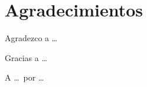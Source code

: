 \newpage
\thispagestyle{plain}

\section*{Agradecimientos} %

Agradezco a \dots

Gracias a \dots

A \dots \ por \dots

\afterpage{\blankpage} %